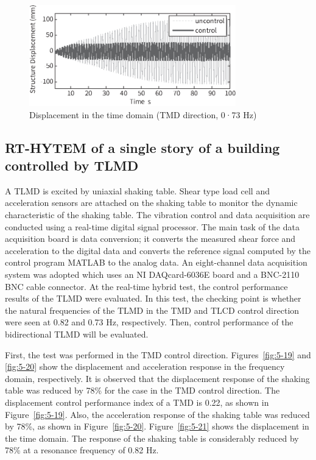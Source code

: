 \begin{figure}[ht]
\centering
\includegraphics[width=0.8\textwidth] {figure/5-11.eps}
\caption{Displacement in the time domain (TMD direction, 0·73 Hz)}
\label{fig:5-11}
\end{figure}

\subsection{RT-HYTEM of a single story of a building controlled by TLMD}

A TLMD is excited by uniaxial shaking table. Shear type load cell and acceleration sensors are attached on the shaking table to monitor the dynamic characteristic of the shaking table. The vibration control and data acquisition are conducted using a real-time digital signal processor. The main task of the data acquisition board is data conversion; it converts the measured shear force and acceleration to the digital data and converts the reference signal computed by the control program MATLAB to the analog data. An eight-channel data acquisition system was adopted which uses an NI DAQcard-6036E board and a BNC-2110 BNC cable connector. At the real-time hybrid test, the control performance results of the TLMD were evaluated. In this test, the checking point is whether the natural frequencies of the TLMD in the TMD and TLCD control direction were seen at 0.82 and 0.73 Hz, respectively. Then, control performance of the bidirectional TLMD will be evaluated.

First, the test was performed in the TMD control direction. Figures~\ref{fig:5-19} and \ref{fig:5-20} show the displacement and acceleration response in the frequency domain, respectively. It is observed that the displacement response of the shaking table was reduced by 78\% for the case in the TMD control direction. The displacement control performance index of a TMD is 0.22, as shown in Figure~\ref{fig:5-19}. Also, the acceleration response of the shaking table was reduced by 78\%, as shown in Figure~\ref{fig:5-20}. Figure~\ref{fig:5-21} shows the displacement in the time domain. The response of the shaking table is considerably reduced by 78\% at a resonance frequency of 0.82 Hz.

